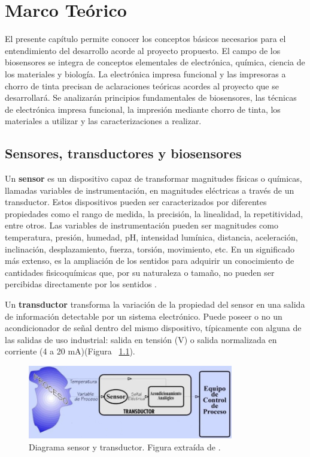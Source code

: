 \chapter{Marco Te\'orico}
El presente capítulo permite conocer los conceptos básicos necesarios para el entendimiento del desarrollo acorde al proyecto propuesto. El campo de los biosensores se integra de conceptos elementales de electrónica, química, ciencia de los materiales y biología. La electrónica impresa funcional y las impresoras a chorro de tinta precisan de aclaraciones teóricas acordes al proyecto que se desarrollará. Se analizarán principios fundamentales de biosensores, las técnicas de electrónica impresa funcional, la impresión mediante chorro de tinta, los materiales a utilizar y las caracterizaciones a realizar.

\section{Sensores, transductores y biosensores}
Un \textbf{sensor} es un dispositivo capaz de transformar magnitudes físicas o químicas, llamadas variables de instrumentación, en magnitudes eléctricas a través de un transductor. Estos dispositivos pueden ser caracterizados por diferentes propiedades como el rango de medida, la precisión, la linealidad, la repetitividad, entre otros. Las variables de instrumentación pueden ser magnitudes como temperatura, presión, humedad, pH, intensidad lumínica, distancia, aceleración, inclinación, desplazamiento, fuerza, torsión, movimiento, etc. En un significado más extenso, es la ampliación de los sentidos para adquirir un conocimiento de cantidades fisicoquímicas que, por su naturaleza o tamaño, no pueden ser percibidas directamente por los sentidos \cite{PallasAreny}.

Un \textbf{transductor} transforma la variación de la propiedad del sensor en una salida de información detectable por un sistema electrónico. Puede poseer o no un acondicionador de señal dentro del mismo dispositivo, típicamente con alguna de las salidas de uso industrial: salida en tensión (V) o salida normalizada en corriente (4 a 20 mA)(Figura ~\ref{fig:Figura_concepto_sensor}).

\begin{figure}[H]
  \centering
    \includegraphics[width=0.8\textwidth]{Figuras/Figura_concepto_sensor}
  \caption{Diagrama sensor y transductor. Figura extraída de \cite{Hector1}.}
  \label{fig:Figura_concepto_sensor}
\end{figure}


